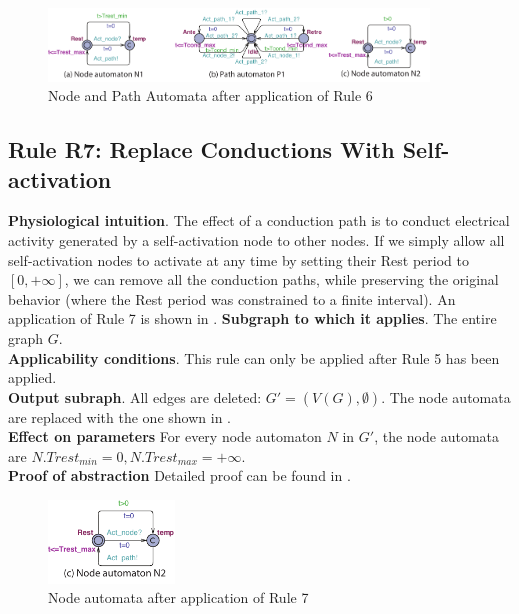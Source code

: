 \begin{figure}[!h]
	\centering
	\includegraphics[width=0.9\textwidth]{figs/rule5.pdf}
	\caption{\small Node and Path Automata after application of Rule 6}
	\label{fig:rule5}
\end{figure}

\subsection{Rule R7: Replace Conductions With Self-activation}
\textbf{Physiological intuition}. 
The effect of a conduction path is to conduct electrical activity generated by a self-activation node to other nodes. 
If we simply allow all self-activation nodes to activate at any time by setting their Rest period to $[0,+\infty]$, we can remove all the conduction paths, while preserving the original behavior (where the Rest period was constrained to a finite interval).
An application of Rule 7 is shown in .
\textbf{Subgraph to which it applies}.
The entire graph $G$.\\
\textbf{Applicability conditions}.
This rule can only be applied after Rule 5 has been applied.\\
\textbf{Output subraph}.
All edges are deleted: $G' = (V(G), \emptyset)$. The node automata are replaced with the one shown in .\\
\textbf{Effect on parameters}
For every node automaton $N$ in $G'$, the node automata are $N.Trest_{min}=0,N.Trest_{max} = +\infty$.\\
\textbf{Proof of abstraction} Detailed proof can be found in \cite{regar_tech}.

\begin{figure}[!h]
	\centering
	\includegraphics[width=0.3\textwidth]{figs/rule6.pdf}
	\caption{\small Node automata after application of Rule 7}
	\label{fig:rule6}
\end{figure}

